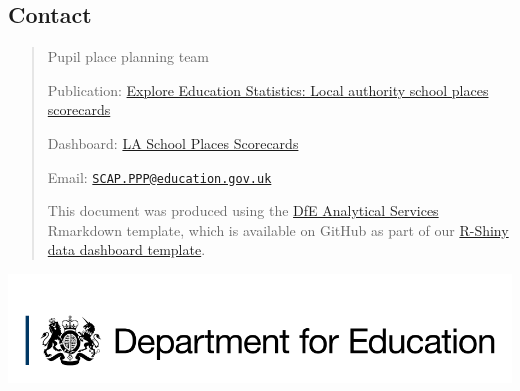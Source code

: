 \documentclass[
]{article}
\begin{document}
\hypertarget{contact}{%
\subsection{Contact}\label{contact}}

\begin{quote}
Pupil place planning team

Publication:
\href{https://explore-education-statistics.service.gov.uk/find-statistics/local-authority-school-places-scorecards}{Explore
Education Statistics: Local authority school places scorecards}

Dashboard:
\href{https://department-for-education.shinyapps.io/la-school-places-scorecards}{LA
School Places Scorecards}

Email:
\href{mailto:SCAP.PPP@education.gov.uk}{\nolinkurl{SCAP.PPP@education.gov.uk}}

This document was produced using the
\href{https://github.com/dfe-analytical-services}{DfE Analytical
Services} Rmarkdown template, which is available on GitHub as part of
our
\href{https://github.com/dfe-analytical-services/shiny-template}{R-Shiny
data dashboard template}.
\end{quote}

\href{https://www.gov.uk/government/organisations/department-for-education}{\includegraphics[width=0.50\linewidth]{"images/Department_for_Education_long.png"}}
\end{document}
